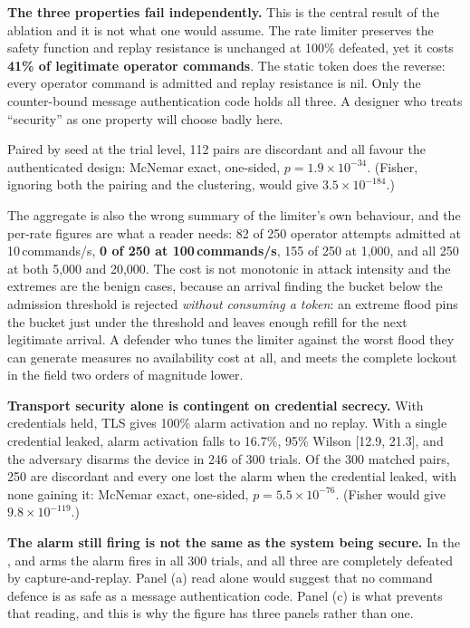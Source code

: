 \textbf{The three properties fail independently.} This is the central result of the ablation and
it is not what one would assume. The rate limiter preserves the safety function and replay
resistance is unchanged at 100\% defeated, yet it costs \textbf{41\% of legitimate operator
commands}. The static token does the reverse: every operator command is admitted and replay
resistance is nil. Only the counter-bound message authentication code holds all three. A designer who treats
``security'' as one property will choose badly here.

Paired by seed at the trial level, 112 pairs are discordant and all favour the authenticated
design: McNemar exact, one-sided, $p = 1.9 \times 10^{-34}$. (Fisher, ignoring both the pairing
and the clustering, would give $3.5 \times 10^{-184}$.)

The aggregate is also the wrong summary of the limiter's own behaviour, and the per-rate figures
are what a reader needs: 82 of 250 operator attempts admitted at 10\,commands/s, \textbf{0 of 250
at 100\,commands/s}, 155 of 250 at 1,000, and all 250 at both 5,000 and 20,000. The cost is not
monotonic in attack intensity and the extremes are the benign cases, because an arrival finding
the bucket below the admission threshold is rejected \emph{without consuming a token}: an extreme
flood pins the bucket just under the threshold and leaves enough refill for the next legitimate
arrival. A defender who tunes the limiter against the worst flood they can generate measures no
availability cost at all, and meets the complete lockout in the field two orders of magnitude
lower.

\textbf{Transport security alone is contingent on credential secrecy.} With credentials held,
TLS gives 100\% alarm activation and no replay. With a single credential leaked, alarm
activation falls to 16.7\%, 95\% Wilson [12.9, 21.3], and the adversary disarms the device in
246 of 300 trials. Of the 300 matched pairs, 250 are discordant and every one lost the alarm when
the credential leaked, with none gaining it: McNemar exact, one-sided,
$p = 5.5 \times 10^{-76}$. (Fisher would give $9.8 \times 10^{-119}$.)

\textbf{The alarm still firing is not the same as the system being secure.} In the
,  and  arms the alarm fires in all 300 trials, and all
three are completely defeated by capture-and-replay. Panel (a) read alone would suggest that no
command defence is as safe as a message authentication code. Panel (c) is what prevents that
reading, and this is why the figure has three panels rather than one.

